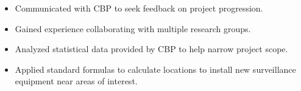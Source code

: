 \accomplishments
\begin{itemize}[leftmargin=*]
\item Communicated with CBP to seek feedback on project progression.
\item Gained experience collaborating with multiple research groups.
\item Analyzed statistical data provided by CBP to help narrow project scope. 
\item Applied standard formulas to calculate locations to install new surveillance equipment near areas of interest.
\end{itemize}